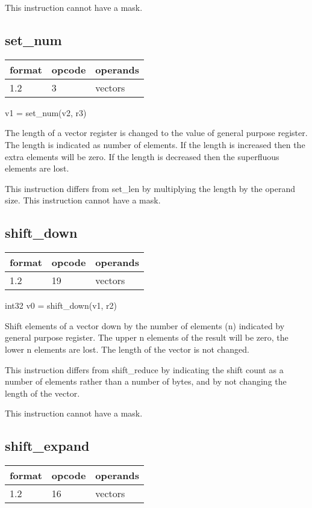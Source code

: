 \documentclass[forwardcom.tex]{subfiles}
\begin{document}
This instruction cannot have a mask.
\vv

\subsection{set\_num}
\label{table:setNumInstruction}
\begin{tabular}{|p{12mm}|p{15mm}|p{100mm}|}
\hline
\bfseries format & \bfseries opcode & \bfseries operands \\ \hline
1.2 & 3 & vectors \\ \hline
\end{tabular}
\vv

v1 = set\_num(v2, r3)
\vv

The length of a vector register is changed to the value of general purpose register. The length is indicated as number of elements. If the length is increased then the extra elements will be zero. If the length is decreased then the superfluous elements are lost.

\vv
This instruction differs from set\_len by multiplying the length by the operand size.
 This instruction cannot have a mask.


\subsection{shift\_down}
\label{table:shiftDownInstruction}
\begin{tabular}{|p{12mm}|p{15mm}|p{100mm}|}
\hline
\bfseries format & \bfseries opcode & \bfseries operands \\ \hline
1.2 & 19 & vectors \\ \hline
\end{tabular}
\vv

int32 v0 = shift\_down(v1, r2)
\vv

Shift elements of a vector down by the number of elements (n) indicated by general purpose register. 
The upper n elements of the result will be zero, the lower n elements are lost. The length of the vector is not changed.
\vv

This instruction differs from shift\_reduce by indicating the shift count as a number of elements rather than a number of bytes, and by not changing the length of the vector.
\vv

This instruction cannot have a mask.
\vv

\subsection{shift\_expand}
\label{table:shiftExpandInstruction}
\begin{tabular}{|p{12mm}|p{15mm}|p{100mm}|}
\hline
\bfseries format & \bfseries opcode & \bfseries operands \\ \hline
1.2 & 16 & vectors \\ \hline
\end{tabular}
\vv
\end{document}
